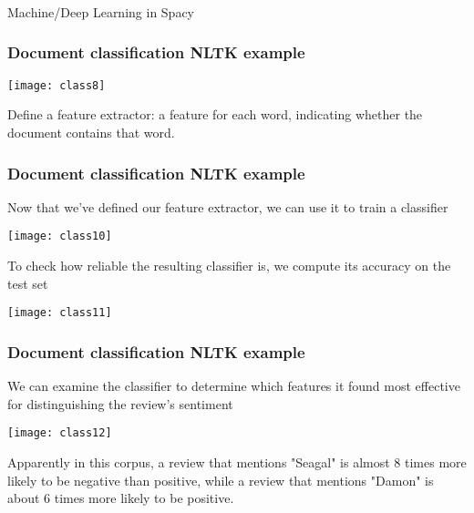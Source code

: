 \begin{frame}[fragile]\frametitle{}

\begin{center}
{\Large Machine/Deep Learning in Spacy}
\end{center}
\end{frame}

\begin{frame}[fragile]
\frametitle{Document classification NLTK example}
\begin{center}
\texttt{[image: class8]}
\end{center}
Define a feature extractor: a feature for each word, indicating whether the document contains that word. 
\end{frame}

\begin{frame}[fragile]
\frametitle{Document classification NLTK example}
Now that we've defined our feature extractor, we can use it to train a classifier
\begin{center}
\texttt{[image: class10]}
\end{center}
To check how reliable the resulting classifier is, we compute its accuracy on the test set 

\begin{center}
\texttt{[image: class11]}
\end{center}
\end{frame}

\begin{frame}[fragile]
\frametitle{Document classification NLTK example}
We can examine the classifier to determine which features it found most effective for distinguishing the review’s sentiment 

\begin{center}
\texttt{[image: class12]}
\end{center}
Apparently in this corpus, a review that mentions "Seagal" is almost 8 times more likely to be negative than positive, while a review that mentions "Damon" is about 6 times more likely to be positive.


\end{frame}


